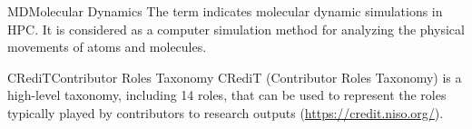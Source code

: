 {MD}{Molecular Dynamics}{
	The term indicates molecular dynamic simulations in HPC. It is considered as a computer simulation method for analyzing the physical movements of atoms and molecules.
}

{CRediT}{Contributor Roles Taxonomy}{
	CRediT (Contributor Roles Taxonomy) is a high-level taxonomy, including 14 roles, that can be used to represent the roles typically played by contributors to research outputs (\url{https://credit.niso.org/}).
}


%

